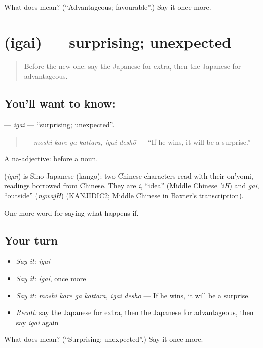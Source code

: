 \begin{tcolorbox}[breakable,colback=teal!4,colframe=teal!35!black,title={Before you move on}]
What does  mean? (\textquotedblleft{}Advantageous; favourable\textquotedblright{}.) Say it once more.
\end{tcolorbox}
\section[\texorpdfstring{\ja{いがい} (igai)}{いがい (igai)}]{ (igai) — surprising; unexpected}

\label{lesson:JA-C532-igai}



\begin{quote}
Before the new one: say the Japanese for extra, then the Japanese for advantageous.
\end{quote}

\subsection*{You'll want to know: }
\textbf{} — \emph{igai} — \textquotedblleft{}surprising; unexpected\textquotedblright{}.

\begin{quote}
\textbf{  } — \emph{moshi kare ga kattara, igai deshō} — \textquotedblleft{}If he wins, it will be a surprise.\textquotedblright{}
\end{quote}

A na-adjective:  before a noun.

\begin{cousinweb}
\textbf{} (\emph{igai}) is Sino-Japanese (kango): two Chinese characters read with their on'yomi, readings borrowed from Chinese. They are \emph{i}, \textquotedblleft{}idea\textquotedblright{} (Middle Chinese \emph{'iH}) and \emph{gai}, \textquotedblleft{}outside\textquotedblright{} (\emph{ngwajH}) (KANJIDIC2; Middle Chinese in Baxter's transcription).
\end{cousinweb}

\begin{grammarlens}[title={What you've built}]
One more word for saying what happens if.
\end{grammarlens}

\subsection*{Your turn}
\begin{itemize}
\raggedright
  \item \emph{Say it:} \emph{igai}
  \item \emph{Say it:} \emph{igai}, once more
  \item \emph{Say it:} \emph{moshi kare ga kattara, igai deshō} — If he wins, it will be a surprise.
  \item \emph{Recall:} say the Japanese for extra, then the Japanese for advantageous, then say \emph{igai} again
\end{itemize}

\begin{tcolorbox}[breakable,colback=teal!4,colframe=teal!35!black,title={Before you move on}]
What does  mean? (\textquotedblleft{}Surprising; unexpected\textquotedblright{}.) Say it once more.
\end{tcolorbox}
